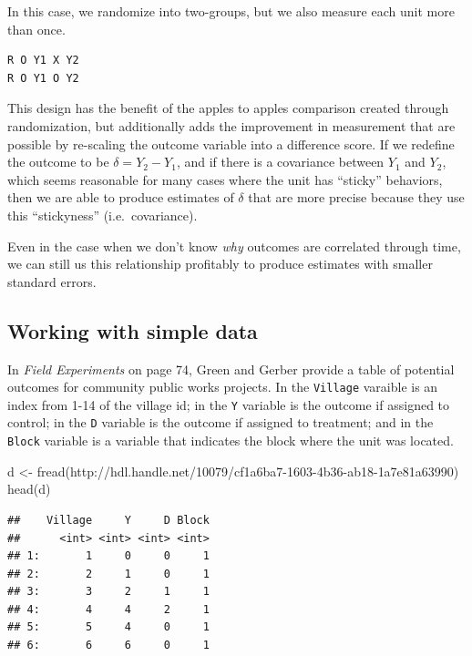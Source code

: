 \documentclass[
]{article}
\newenvironment{Shaded}{\begin{snugshade}}{\end{snugshade}}
\newcommand{\FunctionTok}[1]{\textcolor[rgb]{0.00,0.00,0.00}{#1}}
\newcommand{\NormalTok}[1]{#1}
\newcommand{\OtherTok}[1]{\textcolor[rgb]{0.56,0.35,0.01}{#1}}
\newcommand{\StringTok}[1]{\textcolor[rgb]{0.31,0.60,0.02}{#1}}
\begin{document}
In this case, we randomize into two-groups, but we also measure each unit more than once.

\begin{verbatim}
R O Y1 X Y2
R O Y1 O Y2 
\end{verbatim}

This design has the benefit of the apples to apples comparison created through randomization, but additionally adds the improvement in measurement that are possible by re-scaling the outcome variable into a difference score. If we redefine the outcome to be \(\delta = Y_{2} - Y_{1}\), and if there is a covariance between \(Y_{1}\) and \(Y_{2}\), which seems reasonable for many cases where the unit has ``sticky'' behaviors, then we are able to produce estimates of \(\delta\) that are more precise because they use this ``stickyness'' (i.e.~covariance).

Even in the case when we don't know \emph{why} outcomes are correlated through time, we can still us this relationship profitably to produce estimates with smaller standard errors.

\hypertarget{working-with-simple-data}{%
\subsection{Working with simple data}\label{working-with-simple-data}}

In \emph{Field Experiments} on page 74, Green and Gerber provide a table of potential outcomes for community public works projects. In the \texttt{Village} varaible is an index from 1-14 of the village id; in the \texttt{Y} variable is the outcome if assigned to control; in the \texttt{D} variable is the outcome if assigned to treatment; and in the \texttt{Block} variable is a variable that indicates the block where the unit was located.

\begin{Shaded}
\begin{Highlighting}[]
\NormalTok{d }\OtherTok{\textless{}{-}} \FunctionTok{fread}\NormalTok{(}\StringTok{\textquotesingle{}http://hdl.handle.net/10079/cf1a6ba7{-}1603{-}4b36{-}ab18{-}1a7e81a63990\textquotesingle{}}\NormalTok{) }
\FunctionTok{head}\NormalTok{(d)}
\end{Highlighting}
\end{Shaded}

\begin{verbatim}
##    Village     Y     D Block
##      <int> <int> <int> <int>
## 1:       1     0     0     1
## 2:       2     1     0     1
## 3:       3     2     1     1
## 4:       4     4     2     1
## 5:       5     4     0     1
## 6:       6     6     0     1
\end{verbatim}
\end{document}
